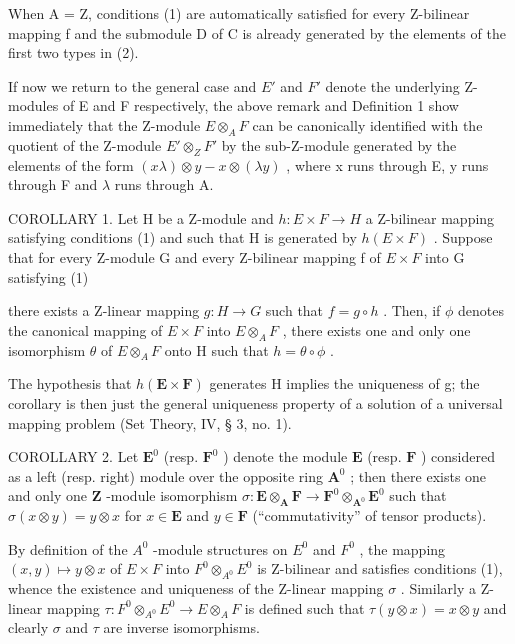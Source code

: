 When A = Z, conditions (1) are automatically satisfied for every Z-bilinear mapping f and the submodule D of C is already generated by the elements of the first two types in (2).

If now we return to the general case and \(E'\) and \(F'\) denote the underlying Z-modules of E and F respectively, the above remark and Definition 1 show immediately that the Z-module \(E \otimes_{A} F\) can be canonically identified with the quotient of the Z-module \(E' \otimes_{Z} F'\) by the sub-Z-module generated by the elements of the form \((x\lambda) \otimes y - x \otimes (\lambda y)\) , where x runs through E, y runs through F and \(\lambda\) runs through A.

COROLLARY 1. Let H be a Z-module and \(h:E \times F \rightarrow H\) a Z-bilinear mapping satisfying conditions (1) and such that H is generated by \(h(E \times F)\) . Suppose that for every Z-module G and every Z-bilinear mapping f of \(E \times F\) into G satisfying (1)

there exists a Z-linear mapping \(g:H \to G\) such that \(f = g \circ h\) . Then, if \(\phi\) denotes the canonical mapping of \(E \times F\) into \(E \otimes_{A} F\) , there exists one and only one isomorphism \(\theta\) of \(E \otimes_{A} F\) onto H such that \(h = \theta \circ \phi\) .

The hypothesis that \(h(\mathbf{E} \times \mathbf{F})\) generates H implies the uniqueness of g; the corollary is then just the general uniqueness property of a solution of a universal mapping problem (Set Theory, IV, § 3, no. 1).

COROLLARY 2. Let \(\mathbf{E}^0\) (resp. \(\mathbf{F}^0\) ) denote the module \(\mathbf{E}\) (resp. \(\mathbf{F}\) ) considered as a left (resp. right) module over the opposite ring \(\mathbf{A}^0\) ; then there exists one and only one \(\mathbf{Z}\) -module isomorphism \(\sigma: \mathbf{E} \otimes_{\mathbf{A}} \mathbf{F} \to \mathbf{F}^0 \otimes_{\mathbf{A}^0} \mathbf{E}^0\) such that \(\sigma(x \otimes y) = y \otimes x\) for \(x \in \mathbf{E}\) and \(y \in \mathbf{F}\) (``commutativity'' of tensor products).

By definition of the \(A^{0}\) -module structures on \(E^{0}\) and \(F^{0}\) , the mapping \((x,y)\mapsto y\otimes x\) of \(E\times F\) into \(F^{0}\otimes_{A^{0}}E^{0}\) is Z-bilinear and satisfies conditions (1), whence the existence and uniqueness of the Z-linear mapping \(\sigma\) . Similarly a Z-linear mapping \(\tau:F^{0}\otimes_{A^{0}}E^{0}\to E\otimes_{A}F\) is defined such that \(\tau(y\otimes x)=x\otimes y\) and clearly \(\sigma\) and \(\tau\) are inverse isomorphisms.

